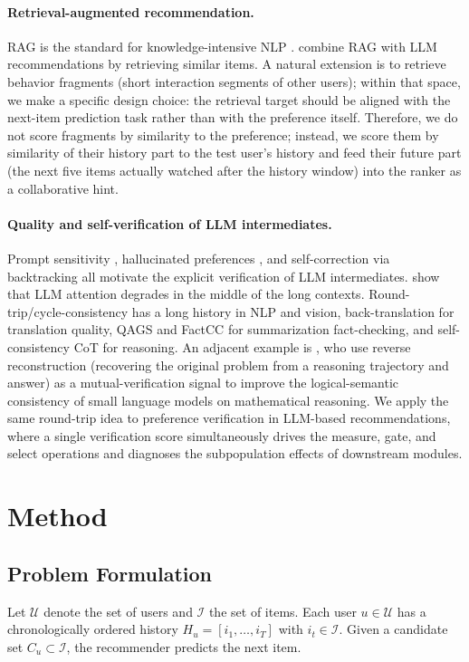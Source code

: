 \documentclass[11pt]{article}
\begin{document}
\paragraph{Retrieval-augmented recommendation.}
RAG is the standard for knowledge-intensive NLP \cite{lewis2020rag}. \citet{wang2025rallrecplus} combine RAG with LLM recommendations by retrieving similar items. A natural extension is to retrieve behavior fragments (short interaction segments of other users); within that space, we make a specific design choice: the retrieval target should be aligned with the next-item prediction task rather than with the preference itself. Therefore, we do not score fragments by similarity to the preference; instead, we score them by similarity of their history part to the test user’s history and feed their future part (the next five items actually watched after the history window) into the ranker as a collaborative hint.

\paragraph{Quality and self-verification of LLM intermediates.}
Prompt sensitivity \cite{lu2022fantastically}, hallucinated preferences \cite{chen2025preferences}, and self-correction via backtracking \cite{sadeghi2025backtracking} all motivate the explicit verification of LLM intermediates. \citet{liu2024lostmiddle} show that LLM attention degrades in the middle of the long contexts. Round-trip/cycle-consistency has a long history in NLP and vision, back-translation for translation quality, QAGS and FactCC for summarization fact-checking, and self-consistency CoT for reasoning. An adjacent example is \citet{kim2025lost}, who use reverse reconstruction (recovering the original problem from a reasoning trajectory and answer) as a mutual-verification signal to improve the logical-semantic consistency of small language models on mathematical reasoning. We apply the same round-trip idea to preference verification in LLM-based recommendations, where a single verification score simultaneously drives the measure, gate, and select operations and diagnoses the subpopulation effects of downstream modules.

\section{Method\label{sec:method}}
\subsection{Problem Formulation}
Let $\mathcal{U}$ denote the set of users and $\mathcal{I}$ the set of items. Each user $u \in \mathcal{U}$ has a chronologically ordered history $H_u = [i_1, \ldots, i_T]$ with $i_t \in \mathcal{I}$. Given a candidate set $C_u \subset \mathcal{I}$, the recommender predicts the next item.
\end{document}
